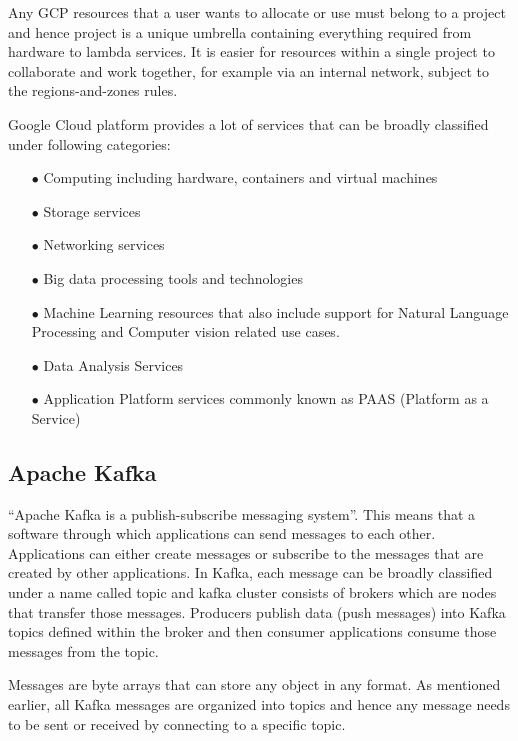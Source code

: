 Any GCP resources that a user wants to allocate or use must belong to a project and hence project is a unique umbrella containing everything required from hardware to lambda services. It is easier for resources within a single project to collaborate and work together, for example via an internal network, subject to the regions-and-zones rules. 

Google Cloud platform provides a lot of services that can be broadly classified under following categories:

\begin{itemize}
	\item[$\bullet$] Computing including hardware, containers and virtual machines
	\item[$\bullet$] Storage services
	\item[$\bullet$] Networking services
	\item[$\bullet$] Big data processing tools and technologies
	\item[$\bullet$] Machine Learning resources that also include support for Natural Language Processing and Computer vision related use cases.
	\item[$\bullet$] Data Analysis Services
	\item[$\bullet$] Application Platform services commonly known as PAAS (Platform as a Service)
\end{itemize}

\subsection{Apache Kafka}
``Apache Kafka is a publish-subscribe messaging system''\cite{hid-sp18-510-kafka}. This means that a software through which applications can send messages to each other. Applications can either create messages or subscribe to the messages that are created by other applications.
In Kafka, each message can be broadly classified under a name called topic and kafka cluster consists of brokers which are nodes that transfer those messages. Producers publish data (push messages) into Kafka topics defined within the broker and then consumer applications consume those messages from the topic. 

Messages are byte arrays that can store any object in any format. As mentioned earlier, all Kafka messages are organized into topics and hence any message needs to be sent or received by connecting to a specific topic. 

